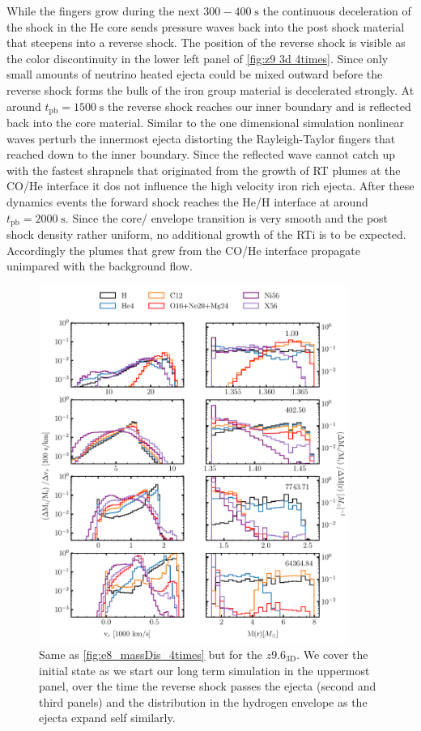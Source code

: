 \documentclass[fleqn,usenatbib]{mnras}
\newcommand{\tpb}{\ensuremath{t_{\text{pb}}}}
\renewcommand{\sec}{\xspace\ensuremath{\mathrm{s}}}
\begin{document}
While the fingers grow during the next $300-400\;\sec$ the continuous deceleration of the shock in the He core sends pressure waves back into the post shock material that steepens into a reverse shock. The position of the reverse shock is visible as the color discontinuity in the lower left panel of \autoref{fig:z9 3d 4times}. Since only small amounts of neutrino heated ejecta could be mixed outward before the reverse shock forms the bulk of the iron group material is decelerated strongly.
At around $\tpb=1500\;\sec$ the reverse shock reaches our inner boundary and is reflected back into the core material.
Similar to the one dimensional simulation nonlinear waves perturb the innermost ejecta distorting the Rayleigh-Taylor fingers that reached down to the inner boundary. Since the reflected wave cannot catch up with the fastest shrapnels that originated from the growth of RT plumes at the CO/He interface it dos not influence the high velocity iron rich ejecta.
After these dynamics events the forward shock reaches the He/H interface at around $t_{\mathrm{pb}}=2000\;\mathrm{s}$. Since the core/ envelope transition is very smooth and the post shock density rather uniform, no additional growth of the RTi is to be expected. Accordingly the plumes that grew from the CO/He interface propagate unimpared with the background flow. 
\begin{figure}
 \centering
 \includegraphics[width=0.9\textwidth]{pic/z93_3d_old_massDis_mvr_mas_4times.pdf}
 \caption{Same as \autoref{fig:e8_massDis_4times} but for the $z9.6_{\mathrm{3D}}$. We cover the initial state as we start our long term simulation in the uppermost panel, over the time the reverse shock passes the ejecta (second and third panels) and the distribution in the hydrogen envelope as the ejecta expand self similarly.}
 \label{fig:z9 massDis}
\end{figure}
\end{document}
